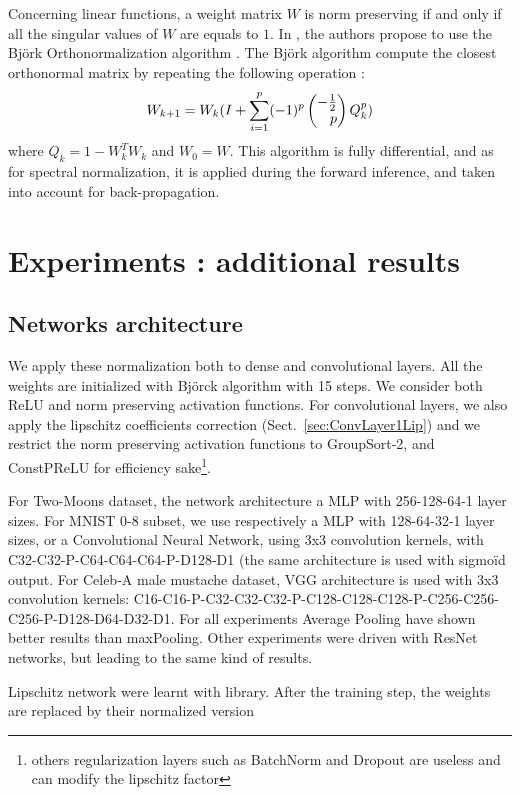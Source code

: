 Concerning linear functions, a weight matrix $W$ is norm preserving if and only if all the singular values of $W$ are equals to $1$. In \cite{pmlr-v97-anil19a}, the authors propose to use the Björk Orthonormalization algorithm \cite{bjorck71Ortho}. The Björk algorithm compute the closest orthonormal matrix by repeating the following operation :
\begin{equation}
    W_{k+1}=W_k(I+\sum_{i=1}^p(-1)^p \Spvek{-\frac{1}{2};p} Q_k^p)
\end{equation}
where $Q_k=1-W^T_kW_k$ and $W_0=W$.
This algorithm is fully differential, and as for spectral normalization, it is applied during the forward inference, and taken into account for back-propagation.

\section{Experiments : additional results}
\subsection{Networks architecture}
\label{sec:networks_architecture}
 We apply these normalization both to dense and convolutional layers. All the weights are initialized with Björck algorithm with 15 steps. We consider both ReLU and norm preserving activation functions. For convolutional layers, we also apply the lipschitz coefficients correction (Sect.~\ref{sec:ConvLayer1Lip}) and we restrict the norm preserving activation functions to GroupSort-2, and ConstPReLU for efficiency sake\footnote{others regularization layers such as BatchNorm and Dropout are useless and can modify the lipschitz factor}. 
 
 For Two-Moons dataset, the network architecture a MLP with 256-128-64-1 layer sizes. For MNIST 0-8 subset, we use respectively a MLP with 128-64-32-1 layer sizes, or a Convolutional Neural Network, using 3x3 convolution kernels, with C32-C32-P-C64-C64-C64-P-D128-D1 (the same architecture is used with sigmo\"id output.
For Celeb-A male mustache dataset, VGG architecture is used with 3x3 convolution kernels: C16-C16-P-C32-C32-C32-P-C128-C128-C128-P-C256-C256-C256-P-D128-D64-D32-D1. For all experiments Average Pooling have shown better results than maxPooling.
Other experiments were driven with ResNet networks, but leading to the same kind of results.

Lipschitz network were learnt with \Deellip library. After the training step, the weights are replaced by their normalized version %


